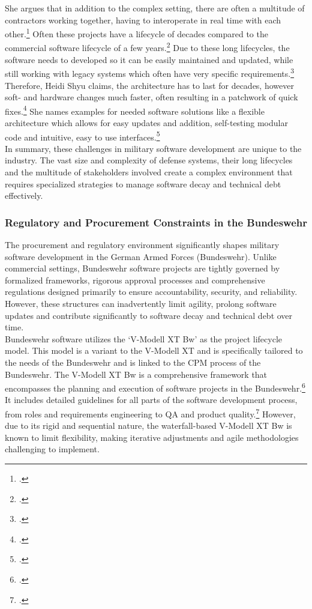 She argues that in addition to the complex setting, there are often a multitude of contractors working together, having to interoperate in real time with each other.\footcite[11]{shyu2017military}
Often these projects have a lifecycle of decades compared to the commercial software lifecycle of a few years.\footcite[14]{shyu2017military}
Due to these long lifecycles, the software needs to developed so it can be easily maintained and updated, while still working with legacy systems
which often have very specific requirements.\footcite[14]{shyu2017military}
Therefore, Heidi Shyu claims, the architecture has to last for decades, however soft- and hardware changes much faster, often resulting in a patchwork of quick fixes.\footcite[15]{shyu2017military}
She names examples for needed software solutions like a flexible architecture which allows for easy updates and addition, self-testing modular code and intuitive, easy to use interfaces.\footcite[17]{shyu2017military}\\

In summary, these challenges in military software development are unique to the industry. The vast size and complexity of defense systems,
their long lifecycles and the multitude of stakeholders involved create a complex environment that requires specialized strategies to manage software decay and technical debt effectively.

\subsubsection{Regulatory and Procurement Constraints in the Bundeswehr}
The procurement and regulatory environment significantly shapes military software development in the German Armed Forces (Bundeswehr). Unlike commercial settings,
Bundeswehr software projects are tightly governed by formalized frameworks, rigorous approval processes and comprehensive regulations designed primarily to ensure 
accountability, security, and reliability. However, these structures can inadvertently limit agility, prolong software updates and contribute significantly to software decay
and technical debt over time.\\

Bundeswehr software utilizes the `V-Modell XT Bw' as the project lifecycle model. This model is a variant to the V-Modell XT and 
is specifically tailored to the needs of the Bundeswehr and is linked to the \ac{CPM} process of the Bundeswehr.
The V-Modell XT Bw is a comprehensive framework that encompasses the planning and execution of software projects in the Bundeswehr.\footcite[6]{bundeswehrVModellXTBw2013}
It includes detailed guidelines for all parts of the software development process, from roles and requirements engineering to \ac{QA} and product quality.\footcite[pp. 20-21]{bundeswehrVModellXTBw2013}
However, due to its rigid and sequential nature, the waterfall-based V-Modell XT Bw is known to limit flexibility, making iterative adjustments and agile methodologies challenging to implement.\\

